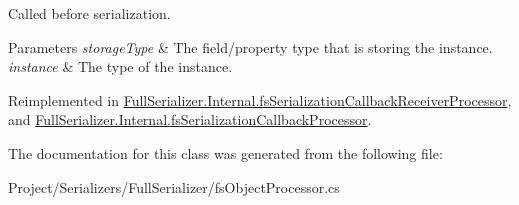 Called before serialization. 


\begin{DoxyParams}{Parameters}
{\em storage\+Type} & The field/property type that is storing the instance.\\
\hline
{\em instance} & The type of the instance.\\
\hline
\end{DoxyParams}


Reimplemented in \hyperlink{class_full_serializer_1_1_internal_1_1fs_serialization_callback_receiver_processor_a8013e3b964d24ee85c19fcd33997c104}{Full\+Serializer.\+Internal.\+fs\+Serialization\+Callback\+Receiver\+Processor}, and \hyperlink{class_full_serializer_1_1_internal_1_1fs_serialization_callback_processor_adee2943e2bf0bacad3957dfb15b32de8}{Full\+Serializer.\+Internal.\+fs\+Serialization\+Callback\+Processor}.



The documentation for this class was generated from the following file\+:\begin{DoxyCompactItemize}
\item 
Project/\+Serializers/\+Full\+Serializer/fs\+Object\+Processor.\+cs\end{DoxyCompactItemize}

